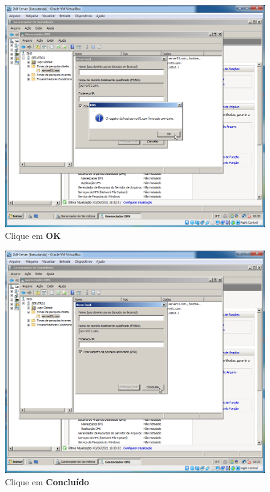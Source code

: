 \documentclass[10pt]{article}
\begin{document}
\begin{figure}[H]
    \centering
    \caption{Clique em \textbf{OK}}
    \label{fig:DNS031}
    \includegraphics[width=\linewidth]{images/windows_server/dns/031.png}
\end{figure}
\begin{figure}[H]
    \centering
    \caption{Clique em \textbf{Concluído}}
    \label{fig:DNS032}
    \includegraphics[width=\linewidth]{images/windows_server/dns/032.png}
\end{figure}
\end{document}
